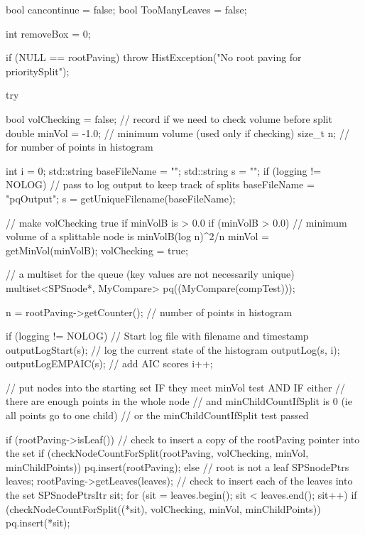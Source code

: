 \begin{DoxyCode}
{   
    bool cancontinue = false;
    bool TooManyLeaves = false;
    
    int removeBox = 0;
    
    if (NULL == rootPaving) {
            throw HistException("No root paving for prioritySplit");
    }

    try {

        bool volChecking = false; // record if we need to check volume before
       split
        double minVol = -1.0; // minimum volume (used only if checking)
        size_t n; // for number of points in histogram

        int i = 0;
        std::string baseFileName = "";
        std::string s = "";
        if (logging != NOLOG) {
            // pass to log output to keep track of splits
            baseFileName = "pqOutput";
            s = getUniqueFilename(baseFileName);
        }

        // make volChecking true if minVolB is > 0.0
        if (minVolB > 0.0) {
            // minimum volume of a splittable node is minVolB(log n)^2/n
            minVol = getMinVol(minVolB);
           volChecking = true;
        }

        // a multiset for the queue (key values are not necessarily unique)
        multiset<SPSnode*, MyCompare> pq((MyCompare(compTest)));

        n = rootPaving->getCounter(); // number of points in histogram

        if (logging != NOLOG) {
             // Start log file with filename and timestamp
            outputLogStart(s);
            // log the current state of the histogram
            outputLog(s, i);
            outputLogEMPAIC(s); // add AIC scores
            i++;
        }

        // put nodes into the starting set IF they meet minVol test AND IF
       either
        // there are enough points in the whole node
                // and minChildCountIfSplit is 0 (ie all points go to one
       child)
        // or the minChildCountIfSplit test passed

        if (rootPaving->isLeaf()) {
            // check to insert a copy of the rootPaving pointer into the set
            if (checkNodeCountForSplit(rootPaving, volChecking, minVol,
                minChildPoints)) {
                    pq.insert(rootPaving);
            }
        }
        else { // root is not a leaf
            SPSnodePtrs leaves;
            rootPaving->getLeaves(leaves);
            // check to insert each of the leaves into the set
            SPSnodePtrsItr sit;
            for (sit = leaves.begin(); sit < leaves.end(); sit++) {
                if (checkNodeCountForSplit((*sit), volChecking, minVol,
                minChildPoints)) {
                    pq.insert(*sit);
                }
            }
        }

}}
\end{DoxyCode}
